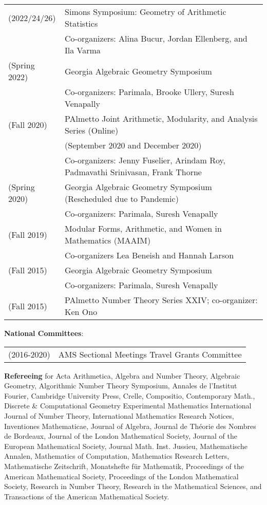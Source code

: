 \documentclass[margin,line]{res}
\newcommand{\defi}[1]{\textsf{#1}} 				%
\begin{document}
\begin{resume}
\begin{tabular}{ll}
  (2022/24/26) & \defi{Simons Symposium: Geometry of Arithmetic Statistics} \\
  & Co-organizers: Alina Bucur, Jordan Ellenberg, and Ila Varma \\
  (Spring 2022) & \defi{Georgia Algebraic Geometry Symposium}\\
               & Co-organizers: Parimala, Brooke Ullery, Suresh Venapally   \\
  (Fall 2020) & \defi{PAlmetto Joint Arithmetic, Modularity, and Analysis Series} (Online)\\
               & (September 2020 and December 2020)\\
               & Co-organizers: Jenny Fuselier, Arindam Roy, Padmavathi Srinivasan, Frank Thorne \\
(Spring 2020) & \defi{Georgia Algebraic Geometry Symposium} (Rescheduled due to Pandemic) \\
               & Co-organizers: Parimala, Suresh Venapally   \\
  (Fall 2019) & \defi{Modular Forms, Arithmetic, and Women in Mathematics} (MAAIM) \\
               & Co-organizers Lea Beneish and Hannah Larson \\  
  (Fall 2015) & \defi{Georgia Algebraic Geometry Symposium} \\
               &  Co-organizers: Parimala, Suresh Venapally   \\
 (Fall 2015) & \defi{PAlmetto Number Theory Series XXIV}; co-organizer: Ken Ono  \\
\end{tabular}

\textbf{National Committees}: 
  \vspace*{-.15in}
  
\begin{tabular}{ll}
(2016-2020) & AMS Sectional Meetings Travel Grants Committee \\
\end{tabular}

\textbf{Refereeing} for 
Acta Arithmetica,
Algebra and Number Theory, 
Algebraic Geometry,
Algorithmic Number Theory Symposium,  
Annales de l'Institut Fourier,
Cambridge University Press,
Crelle, 
Compositio,
Contemporary Math., 
Discrete \& Computational Geometry
Experimental Mathematics
International Journal of Number Theory, 
International Mathematics Research Notices,
Inventiones Mathematicae, 
Journal of Algebra, 
Journal de  Th\'eorie des Nombres de Bordeaux,
Journal of the London Mathematical Society,
Journal of the European Mathematical Society,
Journal Math. Inst. Jussieu,
Mathematische Annalen,
Mathematics of Computation, 
Mathematics Research Letters, 
Mathematische Zeitschrift, 
Monatshefte für Mathematik,
Proceedings of the American Mathematical Society,
Proceedings of the London Mathematical Society, 
Research in Number Theory, 
Research in the Mathematical Sciences,
and 
Transactions of the American Mathematical Society.



\end{resume}
\end{document}
